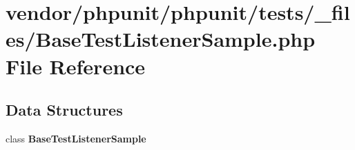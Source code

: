 \section{vendor/phpunit/phpunit/tests/\+\_\+files/\+Base\+Test\+Listener\+Sample.php File Reference}
\label{_base_test_listener_sample_8php}
\subsection*{Data Structures}
\begin{DoxyCompactItemize}
\item 
class {\bf Base\+Test\+Listener\+Sample}
\end{DoxyCompactItemize}
